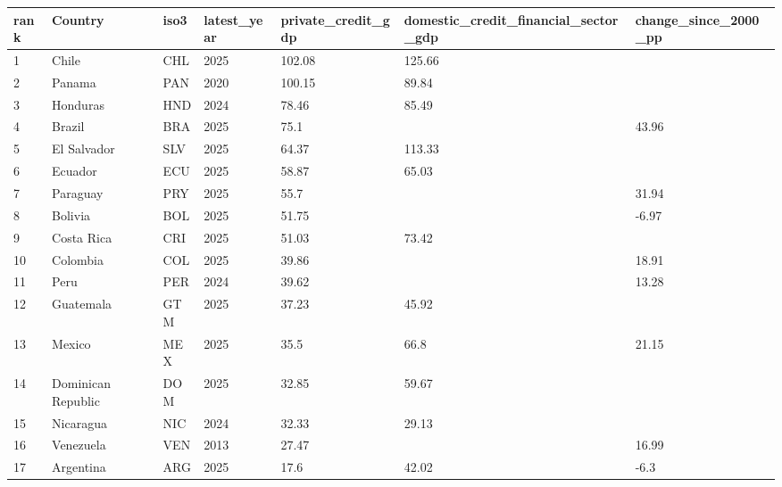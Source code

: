 ﻿%
\begin{tabular}{lllllll}
\hline
rank & Country & iso3 & latest_year & private_credit_gdp & domestic_credit_financial_sector_gdp & change_since_2000_pp \\
\hline
1 & Chile & CHL & 2025 & 102.08 & 125.66 &  \\
2 & Panama & PAN & 2020 & 100.15 & 89.84 &  \\
3 & Honduras & HND & 2024 & 78.46 & 85.49 &  \\
4 & Brazil & BRA & 2025 & 75.1 &  & 43.96 \\
5 & El Salvador & SLV & 2025 & 64.37 & 113.33 &  \\
6 & Ecuador & ECU & 2025 & 58.87 & 65.03 &  \\
7 & Paraguay & PRY & 2025 & 55.7 &  & 31.94 \\
8 & Bolivia & BOL & 2025 & 51.75 &  & -6.97 \\
9 & Costa Rica & CRI & 2025 & 51.03 & 73.42 &  \\
10 & Colombia & COL & 2025 & 39.86 &  & 18.91 \\
11 & Peru & PER & 2024 & 39.62 &  & 13.28 \\
12 & Guatemala & GTM & 2025 & 37.23 & 45.92 &  \\
13 & Mexico & MEX & 2025 & 35.5 & 66.8 & 21.15 \\
14 & Dominican Republic & DOM & 2025 & 32.85 & 59.67 &  \\
15 & Nicaragua & NIC & 2024 & 32.33 & 29.13 &  \\
16 & Venezuela & VEN & 2013 & 27.47 &  & 16.99 \\
17 & Argentina & ARG & 2025 & 17.6 & 42.02 & -6.3 \\
\hline
\end{tabular}


